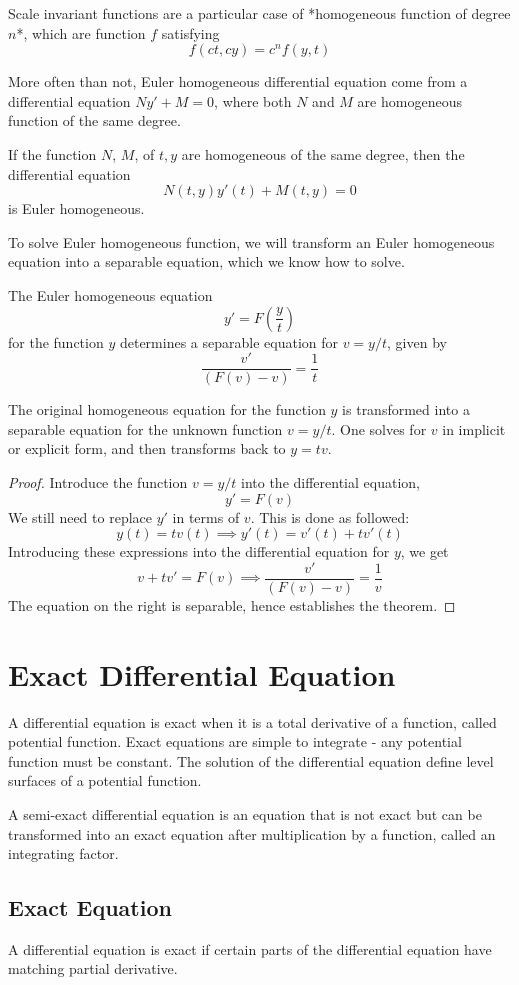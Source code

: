 Scale invariant functions are a particular case of *homogeneous function of degree $n$*, which are function $f$ satisfying $$f(ct,cy)=c^{n}f(y,t)$$

More often than not, Euler homogeneous differential equation come from a differential equation $Ny'+M=0$, where both $N$ and $M$ are homogeneous function of the same degree. 
\begin{theorem}
    If the function $N$, $M$, of $t,y$ are homogeneous of the same degree, then the differential equation $$N(t,y)y'(t)+M(t,y)=0$$
is Euler homogeneous. 
\end{theorem}
To solve Euler homogeneous function, we will transform an Euler homogeneous equation into a separable equation, which we know how to solve.
\begin{theorem}
    The Euler homogeneous equation $$y'=F\left( \frac{y}{t} \right)$$
for the function $y$ determines a separable equation for $v=y/t$, given by $$\frac{v'}{(F(v)-v)}=\frac{1}{t}$$
\end{theorem}
The original homogeneous equation for the function $y$ is transformed into a separable equation for the unknown function $v=y/t$. One solves for $v$ in implicit or explicit form, and then transforms back to $y=tv$. 

\begin{proof}
    Introduce the function $v=y/t$ into the differential equation, $$y'=F(v)$$
We still need to replace $y'$ in terms of $v$. This is done as followed: $$y(t)=tv(t)\implies y'(t)=v'(t)+tv'(t)$$
Introducing these expressions into the differential equation for $y$, we get $$v+tv'=F(v)\implies \frac{v'}{(F(v)-v)}=\frac{1}{v}$$
The equation on the right is separable, hence establishes the theorem. 
\end{proof}
\section{Exact Differential Equation}
A differential equation is exact when it is a total derivative of a function, called potential function. Exact equations are simple to integrate - any potential function must be constant. The solution of the differential equation define level surfaces of a potential function. 

A semi-exact differential equation is an equation that is not exact but can be transformed into an exact equation after multiplication by a function, called an integrating factor.

\subsection{Exact Equation}
A differential equation is exact if certain parts of the differential equation have matching partial derivative. 

